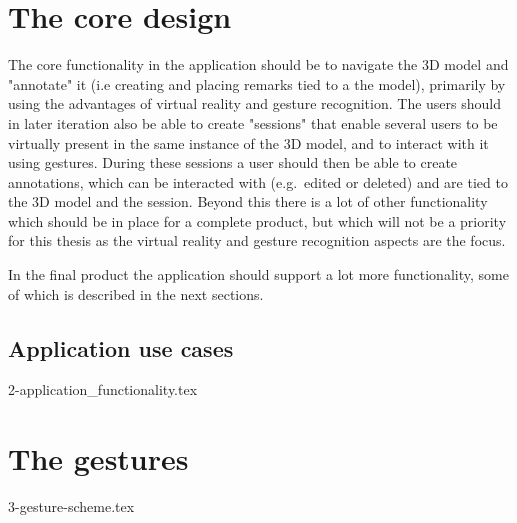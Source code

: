 \section{The core design} 
The core functionality in the application should be to navigate the 3D model and "annotate" it (i.e creating and placing remarks tied to a the model), 
primarily by using the advantages of virtual reality and gesture recognition. 
The users should in later iteration also be able to create "sessions" that enable several users to be virtually present 
in the same instance of the 3D model, and to interact with it using gestures. During these sessions a user should then be able to create annotations, 
which can be interacted with (e.g.~edited or deleted) and are tied to the 3D model and the session. 
Beyond this there is a lot of other functionality which should be in place for a complete product, but which will not be a priority 
for this thesis as the virtual reality and gesture recognition aspects are the focus. 

In the final product the application should support a lot more functionality, some of which is described in the next sections.


\subsection{Application use cases}
{2-application_functionality.tex}

\section{The gestures}
\label{sec:gesture_design}
{3-gesture-scheme.tex}


